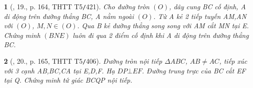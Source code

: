 \documentclass{article}
\newtheorem{baitoan}{}
\begin{document}
\begin{baitoan}[\cite{Thu_Chung_Viet_Minh_circ}, 19., p. 164, THTT T5{\tt/}421]
	Cho đường tròn $(O)$, dây cung BC cố định, A di động trên đường thẳng BC, A nằm ngoài $(O)$. Từ A kẻ 2 tiếp tuyến AM,AN với $(O)$, $M,N\in(O)$. Qua B kẻ đường thẳng song song với AM cắt MN tại E. Chứng minh $(BNE)$ luôn đi qua 2 điểm cố định khi A di động trên đường thẳng BC.
\end{baitoan}

\begin{baitoan}[\cite{Thu_Chung_Viet_Minh_circ}, 20., p. 165, THTT T5{\tt/}406]
	Đường tròn nội tiếp $\Delta ABC$, $AB\ne AC$, tiếp xúc với 3 cạnh AB,BC,CA tại E,D,F. Hạ $DP\bot EF$. Đường trung trực của BC cắt EF tại Q. Chứng minh tứ giác BCQP nội tiếp.
\end{baitoan}


\printbibliography[heading=bibintoc]
\end{document}
